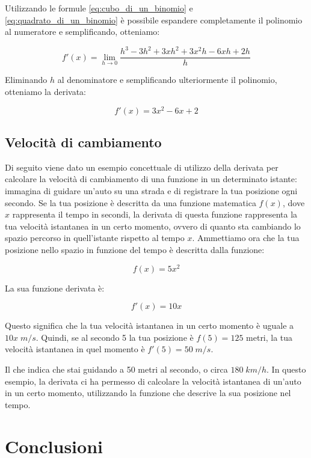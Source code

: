\documentclass{article}
\begin{document}
\newpage

Utilizzando le formule \ref{eq:cubo_di_un_binomio} e \ref{eq:quadrato_di_un_binomio} è possibile espandere completamente il polinomio al numeratore e semplificando, otteniamo:

\[ f'(x) = \lim\limits_{h \to 0} \dfrac{h^3 - 3h^2 + 3xh^2 + 3x^2h - 6xh + 2h}{h} \]

Eliminando $h$ al denominatore e semplificando ulteriormente il polinomio, otteniamo la derivata:

\[ f'(x) = 3x^2 - 6x + 2 \]

\subsection{Velocità di cambiamento}

Di seguito viene dato un esempio concettuale di utilizzo della derivata per calcolare la velocità di cambiamento di una funzione in un determinato istante: immagina di guidare un'auto su una strada e di registrare la tua posizione ogni secondo. Se la tua posizione è descritta da una funzione matematica $f(x)$, dove $x$ rappresenta il tempo in secondi, la derivata di questa funzione rappresenta la tua velocità istantanea in un certo momento, ovvero di quanto sta cambiando lo spazio percorso in quell'istante rispetto al tempo $x$.
Ammettiamo ora che la tua posizione nello spazio in funzione del tempo è descritta dalla funzione:

\[ f(x) = 5x^2 \]

La sua funzione derivata è:

\[ f'(x) = 10x \]

Questo significa che la tua velocità istantanea in un certo momento è uguale a $10x\;m/s$. Quindi, se al secondo 5 la tua posizione è $f(5) = 125$ metri, la tua velocità istantanea in quel momento è $f'(5) = 50\;m/s$.

Il che indica che stai guidando a 50 metri al secondo, o circa $180\; km/h$. In questo esempio, la derivata ci ha permesso di calcolare la velocità istantanea di un'auto in un certo momento, utilizzando la funzione che descrive la sua posizione nel tempo.

\newpage

\section{Conclusioni}
\end{document}
